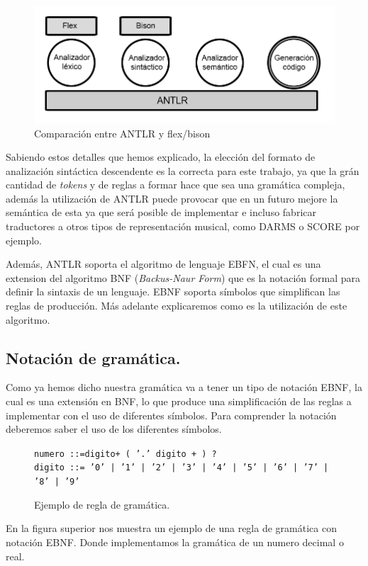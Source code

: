 \documentclass{article}
\begin{document}
    \begin{figure}[H]
        \centering
        \includegraphics[scale = 0.6]{imagesMem/flexantlr.png}
        \caption{Comparación entre ANTLR y flex/bison}
    \end{figure}

    Sabiendo estos detalles que hemos explicado, la elección del formato de analización sintáctica descendente es la correcta
    para este trabajo, ya que la grán cantidad de \textit{tokens} y de reglas a formar hace que sea una gramática compleja,
    además la utilización de ANTLR puede provocar que en un futuro mejore la semántica de esta ya que será posible de implementar
    e incluso fabricar traductores a otros tipos de representación musical, como DARMS o SCORE por ejemplo.

    Además, ANTLR soporta el algoritmo de lenguaje EBFN, el cual es una extension del algoritmo BNF (\textit{Backus-Naur Form})
    que es la notación formal para definir la sintaxis de un lenguaje. EBNF soporta símbolos que simplifican las reglas de
    producción. Más adelante explicaremos como es la utilización de este algoritmo.

    \subsection{Notación de gramática.}
    Como ya hemos dicho nuestra gramática va a tener un tipo de notación EBNF, la cual es una extensión en BNF, lo que
    produce una simplificación de las reglas a implementar con el uso de diferentes símbolos.
    Para comprender la notación deberemos saber el uso de los diferentes símbolos.

    \begin{figure}[H]

                \texttt{numero ::=\space \space digito\space \space + ( '.' \space \space digito  + ) ? } \\
                \texttt{digito ::= '0' | '1' | '2' | '3' | '4' | '5' | '6' | '7' | '8' | '9'}

        \caption{Ejemplo de regla de gramática.}
    \end{figure}
    En la figura superior nos muestra un ejemplo de una regla de gramática con notación EBNF. Donde implementamos la gramática
    de un numero decimal o real.
\end{document}
